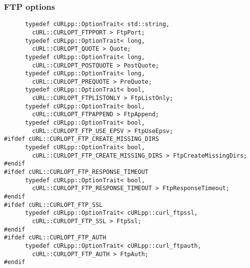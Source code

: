 \documentclass{article}
\begin{document}
\subsubsection{FTP options}
\begin{verbatim}
      typedef cURLpp::OptionTrait< std::string, 
        cURL::CURLOPT_FTPPORT > FtpPort;
      typedef cURLpp::OptionTrait< long, 
        cURL::CURLOPT_QUOTE > Quote;
      typedef cURLpp::OptionTrait< long, 
        cURL::CURLOPT_POSTQUOTE > PostQuote;
      typedef cURLpp::OptionTrait< long, 
        cURL::CURLOPT_PREQUOTE > PreQuote;
      typedef cURLpp::OptionTrait< bool, 
        cURL::CURLOPT_FTPLISTONLY > FtpListOnly;
      typedef cURLpp::OptionTrait< bool, 
        cURL::CURLOPT_FTPAPPEND > FtpAppend;
      typedef cURLpp::OptionTrait< bool, 
        cURL::CURLOPT_FTP_USE_EPSV > FtpUseEpsv;
#ifdef cURL::CURLOPT_FTP_CREATE_MISSING_DIRS
      typedef cURLpp::OptionTrait< bool, 
        cURL::CURLOPT_FTP_CREATE_MISSING_DIRS > FtpCreateMissingDirs;
#endif
#ifdef cURL::CURLOPT_FTP_RESPONSE_TIMEOUT
      typedef cURLpp::OptionTrait< bool, 
        cURL::CURLOPT_FTP_RESPONSE_TIMEOUT > FtpResponseTimeout;
#endif
#ifdef cURL::CURLOPT_FTP_SSL
      typedef cURLpp::OptionTrait< cURLpp::curl_ftpssl, 
        cURL::CURLOPT_FTP_SSL > FtpSsl;
#endif
#ifdef cURL::CURLOPT_FTP_AUTH
      typedef cURLpp::OptionTrait< cURLpp::curl_ftpauth, 
        cURL::CURLOPT_FTP_AUTH > FtpAuth;
#endif
\end{verbatim}      
\end{document}
